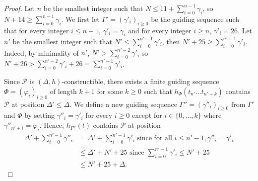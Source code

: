 \documentclass[12pt]{article}
\theoremstyle{definition}
\begin{document}
\begin{proof}
    Let $n$ be the smallest integer such that $N\le 11+\sum_{i=0}^{n - 1}\gamma_i$, so $N + 14 \ge \sum_{i=0}^{n - 1}\gamma_i$.
    We first let $\Gamma' = (\gamma'_i)_{i\ge 0}$ be the guiding sequence such that for every integer $i \le n - 1$, $\gamma'_i = \gamma_i$ and for every integer $i \ge n$, $\gamma'_i = 26$. Let $n'$ be the smallest integer such that $N' \le  \sum_{i = 0}^{n' - 1}\gamma'_i$, then $N' + 25  \ge \sum_{i = 0}^{n' - 1}\gamma'_i$. Indeed, by minimality of $n'$, $N' >  \sum_{i = 0}^{n' - 2}\gamma'_i$ so $N' +26 >  \sum_{i = 0}^{n' - 2}\gamma'_i + 26 = \sum_{i = 0}^{n' - 1}\gamma'_i$.
    
    Since $\mathcal{P}$ is $(\Delta, h)$-constructible, there exists a finite guiding sequence $\Phi = (\varphi_i)_{i \ge 0}$ of length $k + 1$ for some $k \geq 0$ such that $h_\Phi(t_{n'}\dots t_{n' + k})$ contains $\mathcal{P}$ at position $\Delta' \le \Delta$. We define a new guiding sequence $\Gamma'' = (\gamma''_i)_{i \ge 0}$ from $\Gamma'$ and $\Phi$ by setting $\gamma''_i = \gamma'_i$ for every $i \ge 0$ except for $i \in \{0, \dots, k\}$ where $\gamma''_{n' + i} = \varphi_i$.
    Hence, $h_{\Gamma''}(t)$ contains $\mathcal{P}$ at position 
    \begin{align*}
        \Delta' + \sum_{i=0}^{n'-1}\gamma''_i &= \Delta' + \sum_{i=0}^{n' - 1}\gamma'_i \textrm{ since for all } i \le n' - 1, \gamma''_i = \gamma'_i\\
        &\le\Delta' + N' + 25 \textrm{ since } \sum_{i=0}^{n'-1}\gamma'_i \le N' + 25\\
        &\le N' + 25 + \Delta.
    \end{align*}


\end{proof}
\end{document}

